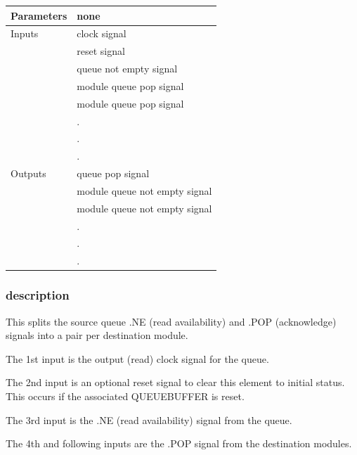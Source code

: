                 \begin{tabular}{| l | l |}
                \hline
                Parameters  & none \\
                \hline
                Inputs      & clock signal \\
                            & reset signal \\
                            & queue not empty signal \\
                            & module queue pop signal \\
                            & module queue pop signal \\
                            & . \\
                            & . \\
                            & . \\
                \hline
                Outputs     & queue pop signal \\
                            & module queue not empty signal \\
                            & module queue not empty signal \\
                            & . \\
                            & . \\
                            & . \\
                \hline
                \end{tabular}

            \subsubsection{description}

                This splits the source queue .NE (read availability) and .POP
                (acknowledge) signals into a pair per destination module.
                
                The 1st input is the output (read) clock signal for the queue.
                
                The 2nd input is an optional reset signal to clear this element
                to initial status. This occurs if the associated QUEUEBUFFER
                is reset.

                The 3rd input is the .NE (read availability) signal from the queue.
                
                The 4th and following inputs are the .POP signal from the
                destination modules.
                
